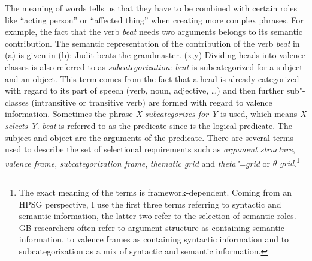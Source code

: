 The meaning of words tells us that they have to be combined with certain roles like ``acting person'' or ``affected thing'' when creating more complex phrases.
For example, the fact that the verb \emph{beat} needs two arguments belongs to its semantic
contribution. The semantic representation of the contribution of the verb \emph{beat} in (a)
is given in (b): 
\eal
\ex Judit beats the grandmaster.
\ex {}(x,y)
\zl
\noindent
Dividing heads into valence classes is also referred to as \emph{subcategorization}:\label{Seite-Subkategoriesierung} 
\emph{beat} is subcategorized for a subject and an object.
This term comes from the fact that a head is already categorized with regard to its
part of speech (verb, noun, adjective, \ldots) and then further sub"-classes (\eg intransitive or
transitive verb) are formed with regard to valence information. Sometimes the phrase \emph{X subcategorizes for Y} is used, which means \emph{X selects Y}.
\emph{beat} is referred to as the predicate since 
 is the logical predicate.
The subject and object are the arguments of the predicate. There are several terms used
to describe the set of selectional requirements such
as \emph{argument structure}, \emph{valence frame},
\emph{subcategorization frame}, \emph{thematic grid}
and \emph{theta"=grid} or \emph{$\theta$-grid}.\footnote{%
The exact meaning of the terms is framework-dependent. Coming from an HPSG perspective, I use the first three terms referring to syntactic and
semantic information, the latter two refer to the selection of semantic roles. GB researchers often
refer to argument structure as containing semantic information, to valence frames as containing
syntactic information and to subcategorization as a mix of syntactic and semantic information.}

